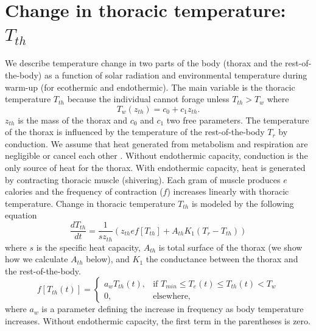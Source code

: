 \documentclass[12pt]{article}
\begin{document}
\section*{Change in thoracic temperature: $T_{th}$}
We describe temperature change in two parts of the body (thorax and the rest-of-the-body) as a function of solar radiation and environmental temperature during warm-up (for ecothermic and endothermic). 
The main variable is the thoracic temperature $T_{th}$ because the individual cannot forage unless $T_{th} > T_w$ where
\begin{equation} \label{eq:Tw}
	T_w(z_{th}) = c_0+ c_1 z_{th}.
\end{equation}
$z_{th}$ is the mass of the thorax and $c_0$ and $c_1$ two free parameters.
The temperature of the thorax is influenced by the temperature of the rest-of-the-body $T_r$ by conduction.
We assume that heat  generated from metabolism and respiration are negligible or cancel each other \citep{Angilletta2009}. 
Without endothermic capacity,  conduction is the only source of heat for the thorax.
With endothermic capacity, heat is generated by contracting thoracic muscle (shivering).
Each gram of muscle produces $e$ calories and the frequency of contraction ($f$) increases linearly with thoracic temperature.
Change in thoracic temperature $T_{th}$ is modeled by the following equation
\begin{equation} \label{eq:dTh}
	\frac{dT_{th}}{dt} = \frac{1}{s z_{th}} (z_{th} e f[T_{th}] +  A_{th} K_1(T_r - T_{th}))
\end{equation}
where $s$ is the specific heat capacity, $A_{th}$ is total surface of the thorax (we show how we calculate $A_{th}$ below), and $K_1$ the conductance between the thorax and the rest-of-the-body.
\[f[T_{th}(t)] = 
\begin{cases}
	 a_w T_{th}(t) , & \mbox{if } T_{min} \leq T_e(t) \leq T_{th}(t) < T_w \\
	0, & \mbox{elsewhere,}
\end{cases}\]
where $a_w$ is a parameter defining the increase in frequency as body temperature increases.
Without endothermic capacity, the first term in the parentheses is zero.
\end{document}
